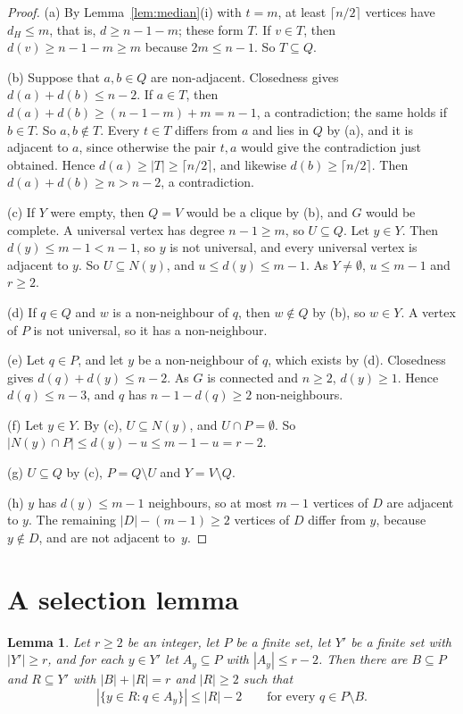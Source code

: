 \documentclass[11pt,a4paper]{article}
\newtheorem{lemma}[theorem]{Lemma}
\theoremstyle{remark}
\newcommand{\ceil}[1]{\lceil #1\rceil}
\begin{document}
\begin{proof}
(a) By Lemma~\ref{lem:median}(i) with $t=m$, at least $\ceil{n/2}$ vertices have $d_H\le m$,
that is, $d\ge n-1-m$; these form $T$. If $v\in T$, then $d(v)\ge n-1-m\ge m$ because
$2m\le n-1$. So $T\subseteq Q$.

(b) Suppose that $a,b\in Q$ are non-adjacent. Closedness gives $d(a)+d(b)\le n-2$. If $a\in T$,
then $d(a)+d(b)\ge(n-1-m)+m=n-1$, a contradiction; the same holds if $b\in T$. So
$a,b\notin T$. Every $t\in T$ differs from $a$ and lies in $Q$ by (a), and it is adjacent to
$a$, since otherwise the pair $t,a$ would give the contradiction just obtained. Hence
$d(a)\ge|T|\ge\ceil{n/2}$, and likewise $d(b)\ge\ceil{n/2}$. Then $d(a)+d(b)\ge n>n-2$, a
contradiction.

(c) If $Y$ were empty, then $Q=V$ would be a clique by (b), and $G$ would be complete. A
universal vertex has degree $n-1\ge m$, so $U\subseteq Q$. Let $y\in Y$. Then
$d(y)\le m-1<n-1$, so $y$ is not universal, and every universal vertex is adjacent to $y$. So
$U\subseteq N(y)$, and $u\le d(y)\le m-1$. As $Y\ne\emptyset$, $u\le m-1$ and $r\ge 2$.

(d) If $q\in Q$ and $w$ is a non-neighbour of $q$, then $w\notin Q$ by (b), so $w\in Y$. A vertex
of $P$ is not universal, so it has a non-neighbour.

(e) Let $q\in P$, and let $y$ be a non-neighbour of $q$, which exists by (d). Closedness gives
$d(q)+d(y)\le n-2$. As $G$ is connected and $n\ge 2$, $d(y)\ge 1$. Hence $d(q)\le n-3$, and $q$
has $n-1-d(q)\ge 2$ non-neighbours.

(f) Let $y\in Y$. By (c), $U\subseteq N(y)$, and $U\cap P=\emptyset$. So
$|N(y)\cap P|\le d(y)-u\le m-1-u=r-2$.

(g) $U\subseteq Q$ by (c), $P=Q\setminus U$ and $Y=V\setminus Q$.

(h) $y$ has $d(y)\le m-1$ neighbours, so at most $m-1$ vertices of $D$ are adjacent to $y$.
The remaining $|D|-(m-1)\ge 2$ vertices of $D$ differ from $y$, because $y\notin D$, and are not
adjacent to~$y$.
\end{proof}

\section{A selection lemma}\label{sec:select}

\begin{lemma}\label{lem:select}
Let $r\ge 2$ be an integer, let $P$ be a finite set, let $Y'$ be a finite set with $|Y'|\ge r$,
and for each $y\in Y'$ let $A_y\subseteq P$ with $|A_y|\le r-2$. Then there are $B\subseteq P$
and $R\subseteq Y'$ with $|B|+|R|=r$ and $|R|\ge 2$ such that
\[
  |\{y\in R: q\in A_y\}|\le|R|-2\qquad\text{for every }q\in P\setminus B .
\]
\end{lemma}
\end{document}
